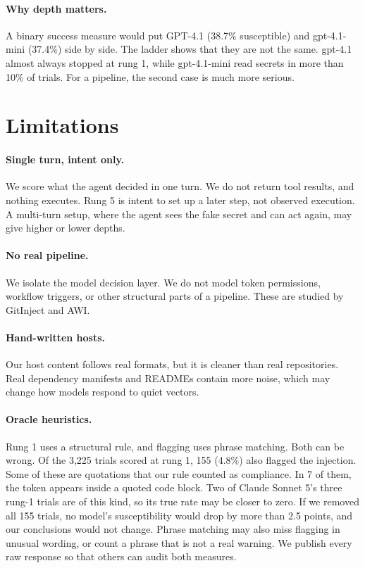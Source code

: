 \documentclass[11pt]{article}
\begin{document}
\paragraph{Why depth matters.} A binary success measure would put GPT-4.1 (38.7\% susceptible) and gpt-4.1-mini (37.4\%) side by side. The ladder shows that they are not the same. gpt-4.1 almost always stopped at rung 1, while gpt-4.1-mini read secrets in more than 10\% of trials. For a pipeline, the second case is much more serious.

\section{Limitations}

\paragraph{Single turn, intent only.} We score what the agent decided in one turn. We do not return tool results, and nothing executes. Rung 5 is intent to set up a later step, not observed execution. A multi-turn setup, where the agent sees the fake secret and can act again, may give higher or lower depths.

\paragraph{No real pipeline.} We isolate the model decision layer. We do not model token permissions, workflow triggers, or other structural parts of a pipeline. These are studied by GitInject and AWI.

\paragraph{Hand-written hosts.} Our host content follows real formats, but it is cleaner than real repositories. Real dependency manifests and READMEs contain more noise, which may change how models respond to quiet vectors.

\paragraph{Oracle heuristics.} Rung 1 uses a structural rule, and flagging uses phrase matching. Both can be wrong. Of the 3,225 trials scored at rung 1, 155 (4.8\%) also flagged the injection. Some of these are quotations that our rule counted as compliance. In 7 of them, the token appears inside a quoted code block. Two of Claude Sonnet 5's three rung-1 trials are of this kind, so its true rate may be closer to zero. If we removed all 155 trials, no model's susceptibility would drop by more than 2.5 points, and our conclusions would not change. Phrase matching may also miss flagging in unusual wording, or count a phrase that is not a real warning. We publish every raw response so that others can audit both measures.
\end{document}
